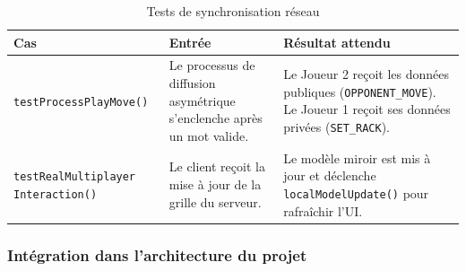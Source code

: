 \documentclass[a4paper]{article}
\begin{document}
\begin{table}[H]
    \centering
    \small
    \begin{tabular}{p{4.5cm} p{4.5cm} p{5.5cm}}
        \toprule
        \textbf{Cas} & \textbf{Entrée} & \textbf{Résultat attendu} \\
        \midrule
        \texttt{testProcessPlayMove()} & Le processus de diffusion asymétrique s'enclenche après un mot valide. & Le Joueur 2 reçoit les données publiques (\texttt{OPPONENT\_MOVE}). Le Joueur 1 reçoit ses données privées (\texttt{SET\_RACK}). \\
        \midrule
        \texttt{testRealMultiplayer Interaction()} & Le client reçoit la mise à jour de la grille du serveur. & Le modèle miroir est mis à jour et déclenche \texttt{localModelUpdate()} pour rafraîchir l'UI. \\
        \bottomrule
    \end{tabular}
    \caption{Tests de synchronisation réseau}
\end{table}

\subsubsection{Intégration dans l'architecture du projet}
\end{document}
